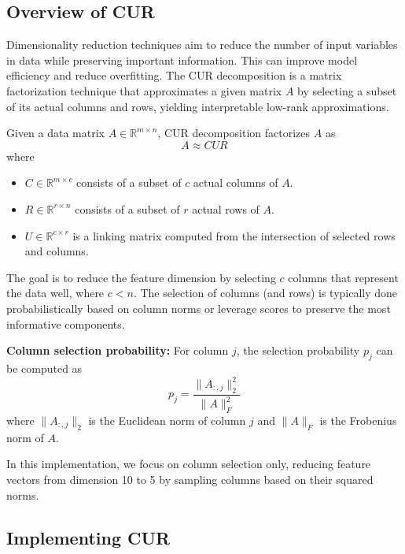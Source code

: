 \subsection{Overview of CUR}
\label{subsec:overview-of-cur}

Dimensionality reduction techniques aim to reduce the number of input variables in data while preserving important information.
This can improve model efficiency and reduce overfitting.
The CUR decomposition is a matrix factorization technique that approximates a given matrix $A$ by selecting a subset of its actual columns and rows, yielding interpretable low-rank approximations.

Given a data matrix $A \in \mathbb{R}^{m \times n}$, CUR decomposition factorizes $A$ as
\begin{equation}
    A \approx CUR
    \label{eq:CUR_equation}
\end{equation}
where
\begin{itemize}
    \item $C \in \mathbb{R}^{m \times c}$ consists of a subset of $c$ actual columns of $A$.
    \item $R \in \mathbb{R}^{r \times n}$ consists of a subset of $r$ actual rows of $A$.
    \item $U \in \mathbb{R}^{c \times r}$ is a linking matrix computed from the intersection of selected rows and columns.
\end{itemize}

The goal is to reduce the feature dimension by selecting $c$ columns that represent the data well, where $c < n$.
The selection of columns (and rows) is typically done probabilistically based on column norms or leverage scores to preserve the most informative components.

\textbf{Column selection probability:} For column $j$, the selection probability $p_j$ can be computed as
\begin{equation}
    p_j = \frac{\| A_{:,j} \|_2^2}{\| A \|_F^2}
    \label{eq:column_selection_probability}
\end{equation}
where $\| A_{:,j} \|_2$ is the Euclidean norm of column $j$ and $\| A \|_F$ is the Frobenius norm of $A$.

In this implementation, we focus on column selection only, reducing feature vectors from dimension 10 to 5 by sampling columns based on their squared norms.

\subsection{Implementing CUR}
\label{subsec:implementing-cur}

